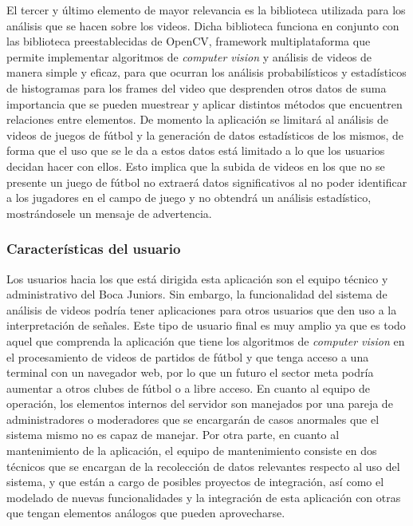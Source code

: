 \documentclass[a4paper]{article}
\newcommand\tab[1][0.55cm]{\hspace*{#1}}
\begin{document}
{    El tercer y último elemento de mayor relevancia es la biblioteca utilizada para los análisis que se hacen sobre los videos. Dicha biblioteca funciona en conjunto con las biblioteca preestablecidas de OpenCV, framework multiplataforma que permite implementar algoritmos de \textit{computer vision} y análisis de videos de manera simple y eficaz,  para que ocurran los análisis probabilísticos y estadísticos de histogramas para los frames del video que desprenden otros datos de suma importancia que se pueden muestrear y aplicar distintos métodos  que encuentren relaciones entre elementos. De momento la aplicación se limitará al análisis de videos de juegos de fútbol y la generación de datos estadísticos de los mismos, de forma que el uso que se le da a estos datos está limitado a lo que los usuarios decidan hacer con ellos. Esto implica que la subida de videos en los que no se presente un juego de fútbol no extraerá datos significativos al no poder identificar a los jugadores en el campo de juego y no obtendrá un análisis estadístico, mostrándosele un mensaje de advertencia. \\


\color{Blue}
\subsubsection{Características del usuario}
\color{black}
\justify 

	\tab Los usuarios hacia los que está dirigida esta aplicación son el equipo técnico y administrativo  del Boca Juniors. Sin embargo, la funcionalidad del sistema de análisis de videos podría tener aplicaciones para otros usuarios que den uso a la interpretación de señales. Este tipo de usuario final es muy amplio ya que es todo aquel que comprenda la aplicación que tiene los algoritmos de \textit{computer vision} en el procesamiento de videos de partidos de fútbol y que tenga acceso a una terminal con un navegador web, por lo que un futuro el sector meta podría aumentar a otros clubes de fútbol o a libre acceso. En cuanto al equipo de operación, los elementos internos del servidor son manejados por una pareja de administradores o moderadores que se encargarán de casos anormales que el sistema mismo no es capaz de manejar. Por otra parte, en cuanto al mantenimiento de la aplicación, el equipo de mantenimiento consiste en dos técnicos que se encargan de la recolección de datos relevantes respecto al uso del sistema, y que están a cargo de posibles proyectos de integración, así como el modelado de nuevas funcionalidades y la integración de esta aplicación con otras que tengan elementos análogos que pueden aprovecharse. \\

}
\end{document}
